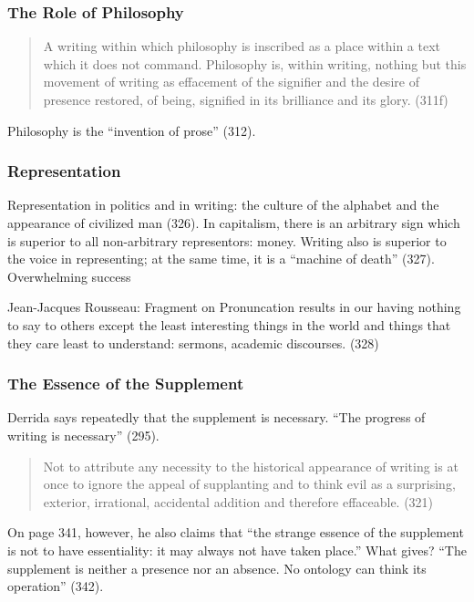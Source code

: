 \documentclass[xcolor=dvipsnames]{beamer}
\begin{document}
\begin{frame}
  \frametitle{The Role of Philosophy}
  \begin{quote}
    A writing within which philosophy is inscribed as a place within
    a text which it does not command. Philosophy is, within writing,
    nothing but this movement of writing as effacement of the
    signifier and the desire of presence restored, of being, signified
    in its brilliance and its glory. (311f)
  \end{quote}
  Philosophy is the ``invention of prose'' (312). 
\end{frame}

\begin{frame}
  \frametitle{Representation}
  Representation in politics and in writing: the culture of the
  alphabet and the appearance of civilized man (326). In capitalism,
  there is an arbitrary sign which is superior to all non-arbitrary
  representors: money. Writing also is superior to the voice in
  representing; at the same time, it is a ``machine of death'' (327).
  Overwhelming success 
  \begin{block}{Jean-Jacques Rousseau: Fragment on Pronuncation}
    results in our having nothing to say to others except the least
    interesting things in the world and things that they care least to
    understand: sermons, academic discourses. (328)
  \end{block}
\end{frame}

\begin{frame}
  \frametitle{The Essence of the Supplement}
  Derrida says repeatedly that the supplement is necessary. ``The
  progress of writing is necessary'' (295). 
  \begin{quote}
    Not to attribute any necessity to the historical appearance of
    writing is at once to ignore the appeal of supplanting and to
    think evil as a surprising, exterior, irrational, accidental
    addition and therefore effaceable. (321)
  \end{quote}
  On page 341, however, he also claims that ``the strange essence of
  the supplement is not to have essentiality: it may always not have
  taken place.'' What gives? ``The supplement is neither a presence
  nor an absence. No ontology can think its operation'' (342).
\end{frame}
\end{document}
